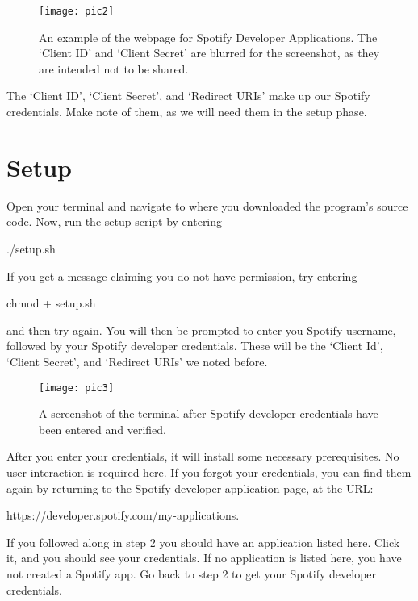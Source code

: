 \documentclass{roffin}
\begin{document}
\begin{figure}[!h]
    \centering
    \texttt{[image: pic2]}
    \caption{An example of the webpage for Spotify Developer Applications. The `Client ID' and `Client Secret' are blurred for the screenshot, as they are intended not to be shared.}
    \label{fig:fig2}
\end{figure}

The `Client ID', `Client Secret', and `Redirect URIs' make up our Spotify credentials. Make note of them, as we will need them in the setup phase.


\section{Setup} 

Open your terminal and navigate to where you downloaded the program's source code. Now, run the setup script by entering
\newline

\hspace{1cm} ./setup.sh

\hfill
\newline
If you get a message claiming you do not have permission, try entering
\newline

\hspace{1cm} chmod + setup.sh

\hfill
\newline
 and then try again. You will then be prompted to enter you Spotify username, followed by your Spotify developer credentials. These will be the `Client Id', `Client Secret', and `Redirect URIs' we noted before.
 
\begin{figure}[!h]
    \centering
    \texttt{[image: pic3]}
    \caption{A screenshot of the terminal after Spotify developer credentials have been entered and verified.}
    \label{fig:fig3}
\end{figure}
 
 After you enter your credentials, it will install some necessary prerequisites. No user interaction is required here. If you forgot your credentials, you can find them again by returning to the Spotify developer application page, at the URL: 
\newline

\hspace{1cm} https://developer.spotify.com/my-applications.

\hfill
\newline
If you followed along in step 2 you should have an application listed here. Click it, and you should see your credentials. If no application is listed here, you have not created a Spotify app. Go back to step 2 to get your Spotify developer credentials.
\end{document}
